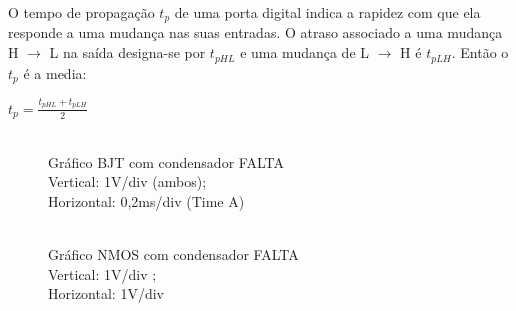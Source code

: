 \documentclass[pdftex,12pt,a4paper]{report}
\begin{document}
O tempo de propagação $t_p$ de uma porta digital indica a rapidez com que ela responde a uma mudança nas suas entradas. O atraso associado a uma mudança H $\rightarrow$ L na saída designa-se por $t_{pHL}$ e uma mudança de L $\rightarrow$ H é $t_{pLH}$. Então o $t_p$ é a media:

\centerline{$t_p = \frac{t_{pHL}+t_{pLH}}{2}$}

\begin{figure}[!htb]
  \centerline{}
  \caption{\\Gráfico BJT com condensador  FALTA\\Vertical: 1V/div (ambos); \\Horizontal: 0,2ms/div (Time A)}\label{bjt}
\endminipage\hfill
{}
  \centerline{}
  \caption{\\Gráfico NMOS com condensador FALTA \\Vertical: 1V/div ; \\Horizontal: 1V/div }\label{fig:nmos}
\endminipage\hfill
\end{figure}
\end{document}
